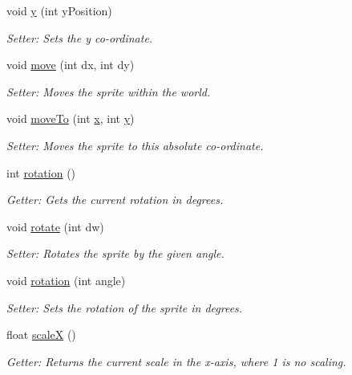 \begin{DoxyCompactItemize}
void \hyperlink{class_sprite_a3cc9eb64901a1b5a109a3fd1c7f548b5}{y} (int y\-Position)
\begin{DoxyCompactList}\small\item\em Setter\-: Sets the y co-\/ordinate. \end{DoxyCompactList}\item 
void \hyperlink{class_sprite_a2b89a3db5c84c3ae082cf71ec292f18b}{move} (int dx, int dy)
\begin{DoxyCompactList}\small\item\em Setter\-: Moves the sprite within the world. \end{DoxyCompactList}\item 
void \hyperlink{class_sprite_a751b76bd42d5f922cee4f6890003b849}{move\-To} (int \hyperlink{class_sprite_a94fe4c517497ba88a93b73cde72b29e8}{x}, int \hyperlink{class_sprite_a2c5cebdd000b4c406432da3ce3a71cd6}{y})
\begin{DoxyCompactList}\small\item\em Setter\-: Moves the sprite to this absolute co-\/ordinate. \end{DoxyCompactList}\item 
int \hyperlink{class_sprite_a6e4553db94d974d88543b5a658f6c0c7}{rotation} ()
\begin{DoxyCompactList}\small\item\em Getter\-: Gets the current rotation in degrees. \end{DoxyCompactList}\item 
void \hyperlink{class_sprite_a52ff92ae9e183b44153f1832b0fe8d9c}{rotate} (int dw)
\begin{DoxyCompactList}\small\item\em Setter\-: Rotates the sprite by the given angle. \end{DoxyCompactList}\item 
void \hyperlink{class_sprite_aceb65d178240d6abf04cd9c27ed0e095}{rotation} (int angle)
\begin{DoxyCompactList}\small\item\em Setter\-: Sets the rotation of the sprite in degrees. \end{DoxyCompactList}\item 
float \hyperlink{class_sprite_a2163af37f17518f7c2a294f8ecc12b1d}{scale\-X} ()
\begin{DoxyCompactList}\small\item\em Getter\-: Returns the current scale in the x-\/axis, where 1 is no scaling. \end{DoxyCompactList}\item 

\end{DoxyCompactItemize}
